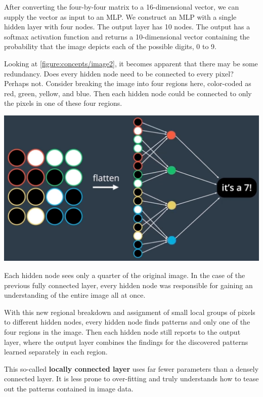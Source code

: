 After converting the four-by-four matrix to a 16-dimensional vector, we can supply the vector as input to an MLP. We construct an MLP with a single hidden layer with four nodes. The output layer has 10 nodes. The output has a softmax activation function and returns a 10-dimensional vector containing the probability that the image depicts each of the possible digits, 0 to 9.\newline

Looking at \autoref{figure:concepts/image2}, it becomes apparent that there may be some redundancy. Does every hidden node need to be connected to every pixel? Perhaps not. Consider breaking the image into four regions here, color-coded as red, green, yellow, and blue. Then each hidden node could be connected to only the pixels in one of these four regions. 

\includegraphics[width=1\linewidth]{img//cnn//concepts/image3.png}

Each hidden node sees only a quarter of the original image. In the case of the previous fully connected layer, every hidden node was responsible for gaining an understanding of the entire image all at once. \newline

With this new regional breakdown and assignment of small local groups of pixels to different hidden nodes, every hidden node finds patterns and only one of the four regions in the image. Then each hidden node still reports to the output layer, where the output layer combines the findings for the discovered patterns learned separately in each region. \newline

This so-called \textbf{locally connected layer} uses far fewer parameters than a densely connected layer. It is less prone to over-fitting and truly understands how to tease out the patterns contained in image data.

